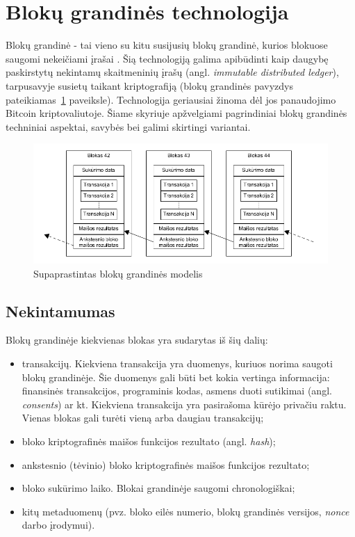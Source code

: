 \section{Blokų grandinės technologija}

Blokų grandinė - tai vieno su kitu susijusių blokų grandinė, kurios blokuose saugomi
nekeičiami įrašai \cite{SatoshiNakamoto}. Šią technologiją galima apibūdinti kaip daugybę paskirstytų nekintamų skaitmeninių įrašų 
(angl. \textit{immutable distributed ledger}), tarpusavyje susietų taikant kriptografiją (blokų grandinės pavyzdys pateikiamas~\ref{fig:blockchain} paveiksle). Technologija geriausiai žinoma dėl jos panaudojimo Bitcoin kriptovaliutoje.
Šiame skyriuje apžvelgiami pagrindiniai blokų grandinės techniniai aspektai, savybės bei galimi skirtingi variantai.

\begin{figure}[H]
    \centering
    \includegraphics[scale=0.6]{img/blockchain}
    \caption{Supaprastintas blokų grandinės modelis}
    \label{fig:blockchain}
\end{figure}

\subsection{Nekintamumas}

Blokų grandinėje kiekvienas blokas yra sudarytas iš šių dalių:

\begin{itemize}
    \item transakcijų. Kiekviena transakcija yra duomenys, kuriuos norima saugoti blokų grandinėje. Šie duomenys gali būti bet kokia vertinga informacija:
    finansinės transakcijos, programinis kodas, asmens duoti sutikimai (angl. \textit{consents}) ar kt. Kiekviena transakcija yra pasirašoma
    kūrėjo privačiu raktu. Vienas blokas gali turėti vieną arba daugiau transakcijų;
    \item bloko kriptografinės maišos funkcijos rezultato (angl. \textit{hash});
    \item ankstesnio (tėvinio) bloko kriptografinės maišos funkcijos rezultato;
    \item bloko sukūrimo laiko. Blokai grandinėje saugomi chronologiškai;
    \item kitų metaduomenų (pvz. bloko eilės numerio, blokų grandinės versijos, \textit{nonce} darbo įrodymui).
\end{itemize}

